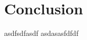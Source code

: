 \chapter{Conclusion}
\label{concl}

asdfsdfasdf
\newpage
asdasasfdfdf


\renewcommand\thefigure{\thechapter .\arabic{figure}}
